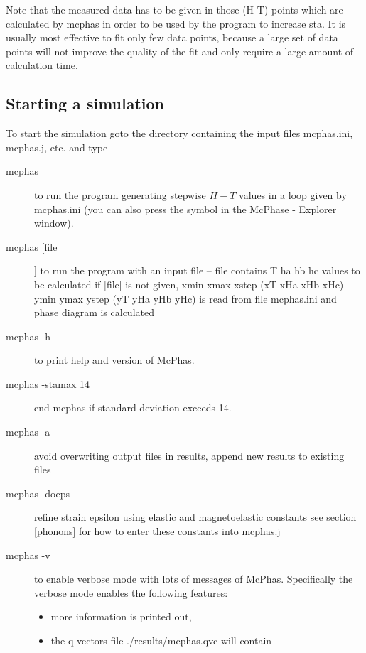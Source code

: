 Note that the measured data has to be given in those (H-T) points which are 
calculated by mcphas in order to be used by the program to increase {\prg sta}.
It is usually most effective to fit only few data points, because a large set
of data points will not improve the quality of the fit and only require a large
amount of calculation time.



\subsection{Starting a simulation}
\label{start}

To start the simulation goto the directory containing the
input files {\prg mcphas.ini, mcphas.j, etc. } and type

\begin{description}
\item[\prg mcphas] to run the program generating stepwise $H-T$ values 
              in a loop given by {\prg mcphas.ini} (you can also press the
              symbol in the {\prg McPhase - Explorer} window).
\item[\prg mcphas [file]]  to run the program with an input file --   
             {\prg file} contains T ha hb hc values to be calculated 
             if [file] is not given, xmin xmax xstep (xT xHa xHb xHc)
             ymin ymax ystep (yT yHa yHb yHc) is read from file {\prg mcphas.ini}
	     and phase diagram is calculated
\item[\prg mcphas -h]  to  print help and version of {\prg McPhas}.
\item[\prg mcphas -stamax 14]  end mcphas if standard deviation exceeds 14.
\item[\prg mcphas -a] avoid overwriting output files in results, append new results to existing files
\item[\prg mcphas -doeps] refine strain epsilon using elastic and magnetoelastic constants 
see section \ref{phonons} for how to enter these constants into {\prg mcphas.j}
\item[\prg mcphas -v]  to  enable verbose mode with lots of messages of {\prg McPhas}. Specifically
the verbose mode enables the following features:
  \begin{itemize}
			          \item more information is printed out, 
			          \item the q-vectors file {\prg ./results/mcphas.qvc} will contain 

\end{itemize}
\end{description}

